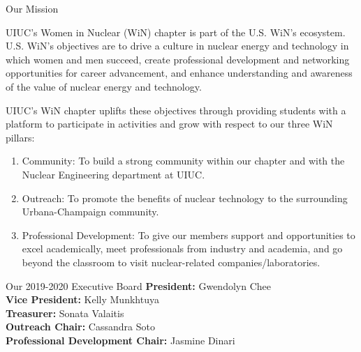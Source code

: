 \documentclass{resume2} %
\begin{document}
\begin{rSection}{Our Mission}
\raggedright
UIUC's Women in Nuclear (WiN) chapter is part of the
U.S. WiN's ecosystem. U.S. WiN's objectives are to
drive a culture in nuclear energy and technology
in which women and men succeed, create professional development
and networking opportunities for career advancement, and enhance understanding
and awareness of the value of nuclear energy and technology.

UIUC's WiN chapter uplifts these objectives through
providing students with a platform to participate
in activities and grow with respect to our three WiN
pillars:

\begin{enumerate}
	\item Community: To build a strong community within our chapter and
	with the Nuclear Engineering department at UIUC.
	\item Outreach: To promote the benefits of nuclear technology to the surrounding
	Urbana-Champaign community.
	\item Professional Development: To give our members support and opportunities to excel
	academically, meet professionals from industry and academia, and go beyond the classroom
	to visit nuclear-related companies/laboratories.
\end{enumerate}

\end{rSection}

\begin{rSection}{Our 2019-2020 Executive Board}
	\textbf{President:} Gwendolyn Chee  \\
	\textbf{Vice President:} Kelly Munkhtuya \\
	\textbf{Treasurer:} Sonata Valaitis \\
	\textbf{Outreach Chair:} Cassandra Soto \\
	\textbf{Professional Development Chair:} Jasmine Dinari
\end{rSection}
\end{document}
